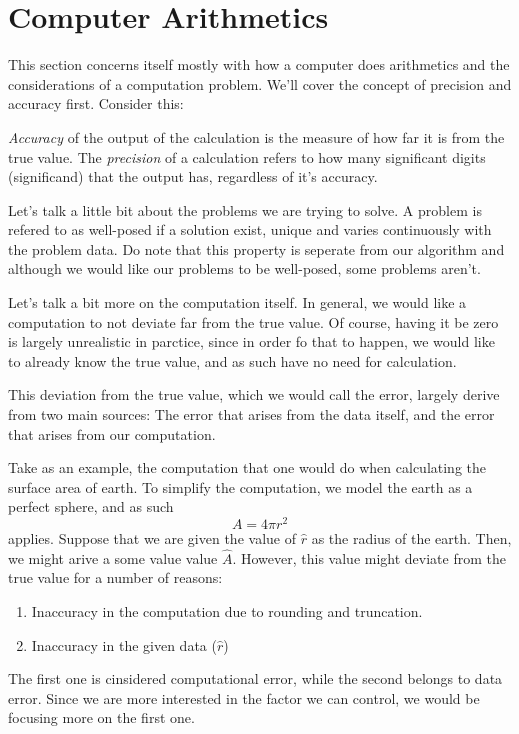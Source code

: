 \documentclass[5pt, a4paper]{article}
\begin{document}
\section{Computer Arithmetics}
This section concerns itself mostly with how a computer does arithmetics and
the considerations of a computation problem. We'll cover the concept of
precision and accuracy first. Consider this: 

\begin{tcolorbox}[title=Precision vs Accuracy]
    \textit{Accuracy} of the output of the calculation is the measure of how far
    it is from the true value. The \textit{precision} of a calculation refers to
    how many significant digits (significand) that the output has, regardless
    of it's accuracy.
\end{tcolorbox}

Let's talk a little bit about the problems we are trying to solve. A problem is
refered to as well-posed if a solution exist, unique and varies continuously
with the problem data. Do note that this property is seperate from our algorithm
and although we would like our problems to be well-posed, some problems aren't.

Let's talk a bit more on the computation itself. In general, we would like a
computation to not deviate far from the true value. Of course, having it be zero
is largely unrealistic in parctice, since in order fo that to happen, we would
like to already know the true value, and as such have no need for calculation.

This deviation from the true value, which we would call the error, largely
derive from two main sources: The error that arises from the data itself, and
the error that arises from our computation. 

Take as an example, the computation that one would do when calculating the
surface area of earth. To simplify the computation, we model the earth as a
perfect sphere, and as such \[
    A = 4\pi r^2
\] 
applies. Suppose that we are given the value of $\hat{r}$ as the radius of the
earth. Then, we might arive a some value value $\hat{A}$. However, this value
might deviate from the true value for a number of reasons: 
\begin{enumerate}
    \item Inaccuracy in the computation due to rounding and truncation.
    \item Inaccuracy in the given data ($\hat{r}$)
\end{enumerate}
The first one is cinsidered computational error, while the second belongs to data
error. Since we are more interested in the factor we can control, we would be
focusing more on the first one.
\end{document}
